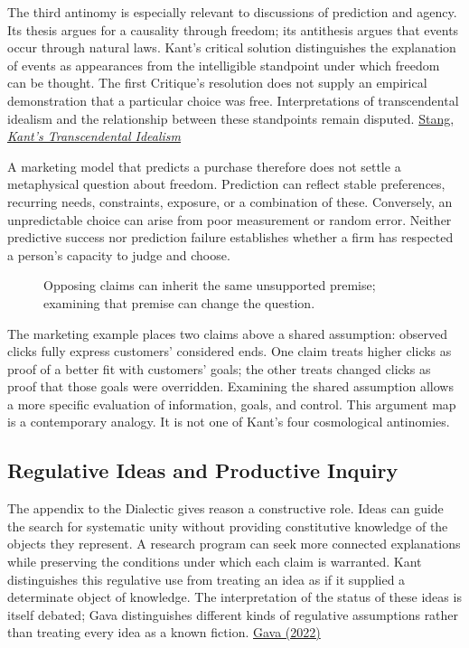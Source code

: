 The third antinomy is especially relevant to discussions of prediction
and agency. Its thesis argues for a causality through freedom; its
antithesis argues that events occur through natural laws. Kant's
critical solution distinguishes the explanation of events as appearances
from the intelligible standpoint under which freedom can be thought. The
first Critique's resolution does not supply an empirical demonstration
that a particular choice was free. Interpretations of transcendental
idealism and the relationship between these standpoints remain disputed.
\href{https://plato.stanford.edu/entries/kant-transcendental-idealism/}{Stang,
\emph{Kant's Transcendental Idealism}}

A marketing model that predicts a purchase therefore does not settle a
metaphysical question about freedom. Prediction can reflect stable
preferences, recurring needs, constraints, exposure, or a combination of
these. Conversely, an unpredictable choice can arise from poor
measurement or random error. Neither predictive success nor prediction
failure establishes whether a firm has respected a person's capacity to
judge and choose.

\begin{figure}[htbp]
\centering

\caption{Opposing claims can inherit the same unsupported premise; examining that premise can change the question.}\label{fig:M09_shared_premise}
\end{figure}

The marketing example places two claims above a shared assumption:
observed clicks fully express customers' considered ends. One claim
treats higher clicks as proof of a better fit with customers' goals; the
other treats changed clicks as proof that those goals were overridden.
Examining the shared assumption allows a more specific evaluation of
information, goals, and control. This argument map is a contemporary
analogy. It is not one of Kant's four cosmological antinomies.

\hypertarget{M09-regulative-ideas-and-productive-inquiry}{%
\subsection{Regulative Ideas and Productive
Inquiry}\label{M09-regulative-ideas-and-productive-inquiry}}

\noindent \noindent The appendix to the Dialectic gives reason a constructive
role. Ideas can guide the search for systematic unity without providing
constitutive knowledge of the objects they represent. A research program
can seek more connected explanations while preserving the conditions
under which each claim is warranted. Kant distinguishes this regulative
use from treating an idea as if it supplied a determinate object of
knowledge. The interpretation of the status of these ideas is itself
debated; Gava distinguishes different kinds of regulative assumptions
rather than treating every idea as a known fiction.
\href{https://doi.org/10.1515/opphil-2022-0202}{Gava (2022)}

